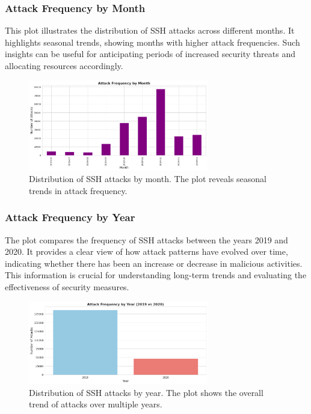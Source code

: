         \subsubsection{Attack Frequency by Month \\}
        
            This plot illustrates the distribution of SSH attacks across different months. It highlights seasonal trends, showing months with higher attack frequencies. Such insights can be useful for anticipating periods of increased security threats and allocating resources accordingly.

            \begin{figure}[H]
                \centering
                \includegraphics[width=0.7\textwidth]{../figures/plots/section1/attack_frequency_by_month.png}
                \caption{Distribution of SSH attacks by month. The plot reveals seasonal trends in attack frequency.}
                \label{fig:attack_frequency_by_month}
            \end{figure}

        \subsubsection{Attack Frequency by Year \\}
        
            The plot compares the frequency of SSH attacks between the years 2019 and 2020. It provides a clear view of how attack patterns have evolved over time, indicating whether there has been an increase or decrease in malicious activities. This information is crucial for understanding long-term trends and evaluating the effectiveness of security measures.

            \begin{figure}[H]
                \centering
                \includegraphics[width=0.7\textwidth]{../figures/plots/section1/attack_frequency_by_year.png}
                \caption{Distribution of SSH attacks by year. The plot shows the overall trend of attacks over multiple years.}
                \label{fig:attack_frequency_by_year}
            \end{figure}
            
